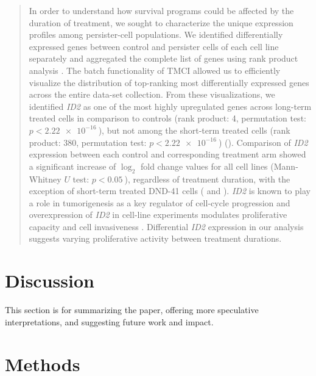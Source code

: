 \begin{refsegment}
\begin{quote}
In order to understand how survival programs could be affected by the duration
of treatment, we sought to characterize the unique expression profiles among
persister-cell populations. We identified differentially expressed genes between
control and persister cells of each cell line separately and aggregated the
complete list of genes using rank product analysis
\autocite{breitlingFEBSLetters2004}. The batch functionality of TMCI allowed us
to efficiently visualize the distribution of top-ranking most differentially
expressed genes across the entire data-set collection. From these
visualizations, we identified \textit{ID2} as one of the most highly upregulated
genes across long-term treated cells in comparison to controls (rank product: 4,
permutation test: \(p < \SI{2.22e-16}{}\)), but not among the short-term treated
cells (rank product: 380, permutation test: \(p < \SI{2.22e-16}{}\))
(). Comparison of
  \textit{ID2} expression between each control and corresponding treatment arm
  showed a significant increase of \(\log_2\) fold change values for all cell
  lines (Mann-Whitney \(U\) test: \(p < \SI{0.05}{}\)), regardless of treatment
  duration, with the exception of short-term treated DND-41 cells
  ( and ). \textit{ID2} is known to play
  a role in tumorigenesis as a key regulator of cell-cycle progression and
  overexpression of \textit{ID2} in cell-line experiments modulates
  proliferative capacity and cell invasiveness \autocite{itahana_role_2003,
    stighall_high_2005}. Differential \textit{ID2} expression in our analysis
  suggests varying proliferative activity between treatment durations.
\end{quote}

\section*{Discussion}

This section is for summarizing the paper, offering more speculative
interpretations, and suggesting future work and impact.

\section*{Methods}

\end{refsegment}
